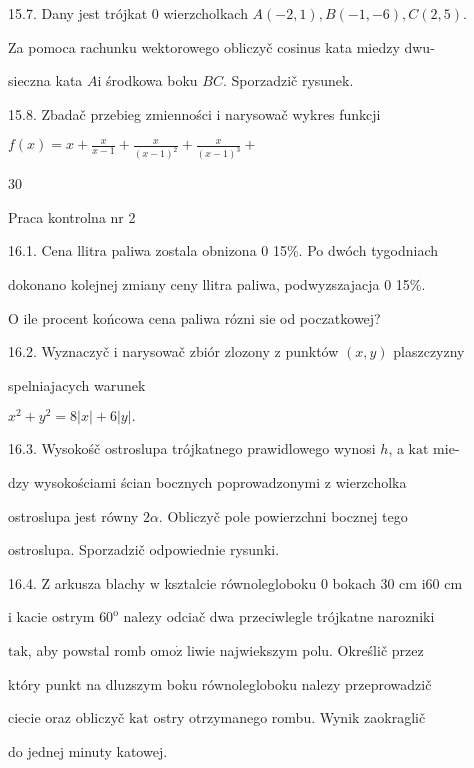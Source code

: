 \documentclass[a4paper,12pt]{article}
\begin{document}
15.7. Dany jest trójkat $0$ wierzcholkach $A(-2,1), B(-1,-6), C(2,5).$

Za pomoca rachunku wektorowego obliczyč cosinus kata miedzy dwu-

sieczna kata $A\mathrm{i}$ środkowa boku $BC$. Sporzadzič rysunek.

15.8. Zbadač przebieg zmienności $\mathrm{i}$ narysowač wykres funkcji

$f(x)=x+\displaystyle \frac{x}{x-1}+\frac{x}{(x-1)^{2}}+\frac{x}{(x-1)^{3}}+$





30

Praca kontrolna nr 2

16.1. Cena llitra paliwa zostala obnizona $0$ 15\%. Po dwóch tygodniach

dokonano kolejnej zmiany ceny llitra paliwa, podwyzszajacja $0$ 15\%.

$\mathrm{O}$ ile procent końcowa cena paliwa rózni $\mathrm{s}\mathrm{i}\mathrm{e}$ od poczatkowej?

16.2. Wyznaczyč $\mathrm{i}$ narysowač zbiór zlozony $\mathrm{z}$ punktów $(x,y)$ plaszczyzny

spelniajacych warunek

$x^{2}+y^{2}=8|x|+6|y|.$

16.3. Wysokośč ostroslupa trójkatnego prawidlowego wynosi $h$, a $\mathrm{k}\mathrm{a}\mathrm{t}$ mie-

dzy wysokościami ścian bocznych poprowadzonymi $\mathrm{z}$ wierzcholka

ostroslupa jest równy $ 2\alpha$. Obliczyč pole powierzchni bocznej tego

ostroslupa. Sporzadzič odpowiednie rysunki.

16.4. $\mathrm{Z}$ arkusza blachy $\mathrm{w}$ ksztalcie równolegloboku $0$ bokach 30 cm $\mathrm{i}60$ cm

$\mathrm{i}$ kacie ostrym $60^{\mathrm{o}}$ nalezy odciač dwa przeciwlegle trójkatne narozniki

$\mathrm{t}\mathrm{a}\mathrm{k}$, aby powstal romb $\mathrm{o}\mathrm{m}\mathrm{o}\dot{\mathrm{z}}$ liwie najwiekszym polu. Określič przez

który punkt na dluzszym boku równolegloboku nalezy przeprowadzič

ciecie oraz obliczyč $\mathrm{k}\mathrm{a}\mathrm{t}$ ostry otrzymanego rombu. Wynik zaokraglič

do jednej minuty katowej.
\end{document}
